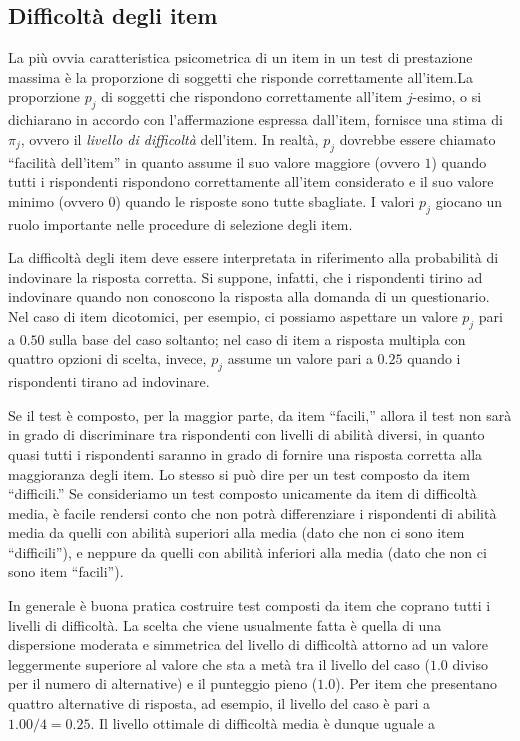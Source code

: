 \documentclass[
  11pt,
]{krantz}
\theoremstyle{definition}
\theoremstyle{definition}
\theoremstyle{definition}
\theoremstyle{definition}
\theoremstyle{remark}
\begin{document}
\hypertarget{difficoltuxe0-degli-item}{%
\subsection{Difficoltà degli item}\label{difficoltuxe0-degli-item}}

La più ovvia caratteristica psicometrica di un item in un test di prestazione massima è la proporzione di soggetti che risponde correttamente all'item.La proporzione \(p_j\) di soggetti che rispondono correttamente all'item \(j\)-esimo, o si dichiarano in accordo con l'affermazione espressa dall'item, fornisce una stima di \(\pi_j\), ovvero il \emph{livello di difficoltà} dell'item. In realtà, \(p_j\) dovrebbe essere chiamato ``facilità dell'item'' in quanto assume il suo valore maggiore (ovvero \(1\)) quando tutti i rispondenti rispondono correttamente all'item considerato e il suo valore minimo (ovvero \(0\)) quando le risposte sono tutte sbagliate. I valori \(p_j\) giocano un ruolo importante nelle procedure di selezione degli item.

La difficoltà degli item deve essere interpretata in riferimento alla probabilità di indovinare la risposta corretta. Si suppone, infatti, che i rispondenti tirino ad indovinare quando non conoscono la risposta alla domanda di un questionario. Nel caso di item dicotomici, per esempio, ci possiamo aspettare un valore \(p_j\) pari a \(0.50\) sulla base del caso soltanto; nel caso di item a risposta multipla con quattro opzioni di scelta, invece, \(p_j\) assume un valore pari a \(0.25\) quando i rispondenti tirano ad indovinare.

Se il test è composto, per la maggior parte, da item ``facili,'' allora il test non sarà in grado di discriminare tra rispondenti con livelli di abilità diversi, in quanto quasi tutti i rispondenti saranno in grado di fornire una risposta corretta alla maggioranza degli item. Lo stesso si può dire per un test composto da item ``difficili.'' Se consideriamo un test composto unicamente da item di difficoltà media, è facile rendersi conto che non potrà differenziare i rispondenti di abilità media da quelli con abilità superiori alla media (dato che non ci sono item ``difficili''), e neppure da quelli con abilità inferiori alla media (dato che non ci sono item ``facili'').

In generale è buona pratica costruire test composti da item che coprano tutti i livelli di difficoltà. La scelta che viene usualmente fatta è quella di una dispersione moderata e simmetrica del livello di difficoltà attorno ad un valore leggermente superiore al valore che sta a metà tra il livello del caso (\(1.0\) diviso per il numero di alternative) e il punteggio pieno (\(1.0\)). Per item che presentano quattro alternative di risposta, ad esempio, il livello del caso è pari a \(1.00/4 = 0.25\). Il livello ottimale di difficoltà media è dunque uguale a
\end{document}

